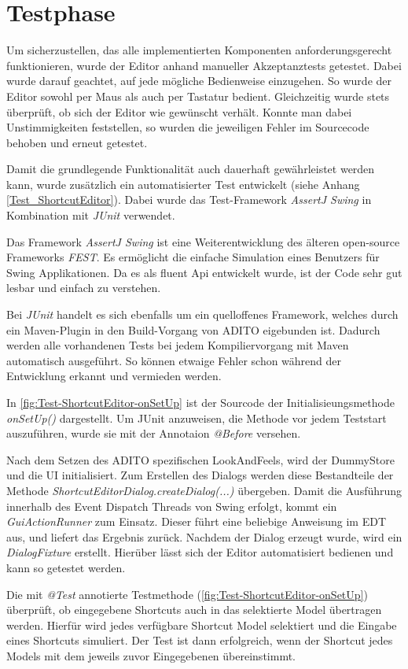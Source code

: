 \section{Testphase}

Um sicherzustellen, das alle implementierten Komponenten anforderungsgerecht funktionieren, wurde der Editor anhand manueller Akzeptanztests getestet. Dabei wurde darauf geachtet, auf jede mögliche Bedienweise einzugehen. So wurde der Editor sowohl per Maus als auch per Tastatur bedient. Gleichzeitig wurde stets überprüft, ob sich der Editor wie gewünscht verhält. Konnte man dabei Unstimmigkeiten feststellen, so wurden die jeweiligen Fehler im Sourcecode behoben und erneut getestet.

Damit die grundlegende Funktionalität auch dauerhaft gewährleistet werden kann, wurde zusätzlich ein automatisierter Test entwickelt (siehe Anhang \ref{Test_ShortcutEditor}). Dabei wurde das Test-Framework \emph{AssertJ Swing} in Kombination mit \emph{JUnit} verwendet.

Das Framework \emph{AssertJ Swing} ist eine Weiterentwicklung des älteren open-source Frameworks \emph{FEST}. Es ermöglicht die einfache Simulation eines Benutzers für Swing Applikationen. Da es als fluent Api entwickelt wurde, ist der Code sehr gut lesbar und einfach zu verstehen.

Bei \emph{JUnit} handelt es sich ebenfalls um ein quelloffenes Framework, welches durch ein Maven-Plugin in den Build-Vorgang von ADITO eigebunden ist. Dadurch werden alle vorhandenen Tests bei jedem Kompiliervorgang mit Maven automatisch ausgeführt. So können etwaige Fehler schon während der Entwicklung erkannt und vermieden werden.



In \autoref{fig:Test-ShortcutEditor-onSetUp} ist der Sourcode der Initialisieungsmethode \emph{onSetUp()} dargestellt. Um JUnit anzuweisen, die Methode vor jedem Teststart auszuführen, wurde sie mit der Annotaion \emph{@Before} versehen. 

\vspace{10px}

Nach dem Setzen des ADITO spezifischen LookAndFeels, wird der DummyStore und die UI initialisiert. Zum Erstellen des Dialogs werden diese Bestandteile der Methode \emph{ShortcutEditorDialog.createDialog(...)} übergeben. Damit die Ausführung innerhalb des Event Dispatch Threads von Swing erfolgt, kommt ein \emph{GuiActionRunner} zum Einsatz. Dieser führt eine beliebige Anweisung im EDT aus, und liefert das Ergebnis zurück. Nachdem der Dialog erzeugt wurde, wird ein \emph{DialogFixture} erstellt. Hierüber lässt sich der Editor automatisiert bedienen und kann so getestet werden.



Die mit \emph{@Test} annotierte Testmethode (\autoref{fig:Test-ShortcutEditor-onSetUp}) überprüft, ob eingegebene Shortcuts auch in das selektierte Model übertragen werden. Hierfür wird jedes verfügbare Shortcut Model selektiert und die Eingabe eines Shortcuts simuliert. Der Test ist dann erfolgreich, wenn der Shortcut jedes Models mit dem jeweils zuvor Eingegebenen übereinstimmt.
\newpage